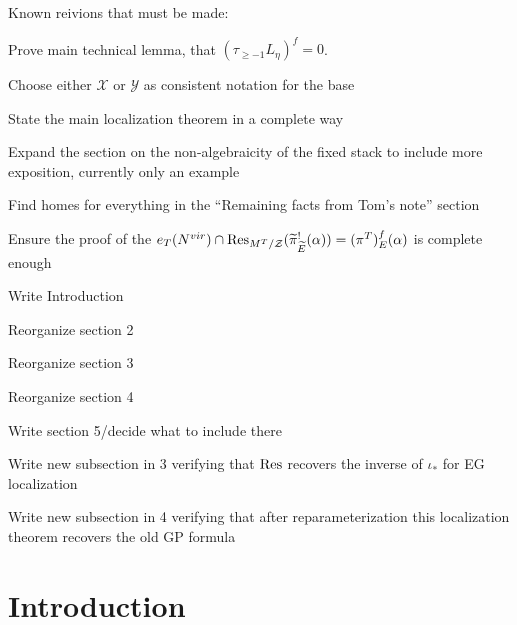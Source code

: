 \documentclass[12pt,dvipsnames]{amsart}
\begin{document}
Known reivions that must be made:
\begin{todolist}
  \item Prove main technical lemma, that \((\tau_{\geq -1}L_\eta)^f = 0\).
  \item Choose either \(\mathcal X\) or \(\mathcal Y\) as consistent notation for the base
  \item State the main localization theorem in a complete way
  \item Expand the section on the non-algebraicity of the fixed stack to include more exposition, currently only an example
  \item Find homes for everything in the ``Remaining facts from Tom's note'' section
  \item Ensure the proof of the \(e_T(N^{vir})\cap \operatorname{Res}_{M^T/\mathcal Z}(\widetilde \pi^!_{\widetilde E}(\alpha)) = (\pi^T)^f_{E}(\alpha)\) is complete enough
  \item Write Introduction
  \item Reorganize section 2
  \item Reorganize section 3
  \item Reorganize section 4
  \item Write section 5/decide what to include there
  \item Write new subsection in 3 verifying that $\operatorname{Res}$ recovers the inverse of \(\iota_*\) for EG localization
  \item Write new subsection in 4 verifying that after reparameterization this localization theorem recovers the old GP formula
\end{todolist}

\newpage

\section{Introduction}
\end{document}
